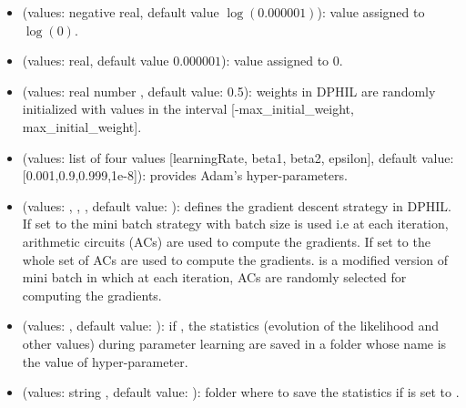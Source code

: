\documentclass[letterpaper,10pt,english]{sphinxmanual}
\begin{document}
\begin{itemize}
\begin{itemize}
\item {} 
 (values: negative real, default value \(\log(0.000001)\)): value assigned to \(\log(0)\).

\item {} 
 (values: real, default value \(0.000001\)): value assigned to \(0\).

\item {} 
 (values: real number , default value: 0.5): weights in DPHIL are randomly initialized with values in the interval {[}-max\_initial\_weight, max\_initial\_weight{]}.

\item {} 
 (values: list of four values {[}learningRate, beta1, beta2, epsilon{]}, default value: {[}0.001,0.9,0.999,1e-8{]}): provides Adam’s hyper-parameters.

\item {} 
 (values: , , , default value: ): defines the gradient descent strategy in DPHIL. If set to  the mini batch strategy with batch size  is used i.e at each iteration,  arithmetic circuits (ACs) are used to compute the gradients. If set to  the whole set of ACs are used to compute the gradients.  is a modified version of mini batch in which at each iteration,   ACs are randomly selected for computing the gradients.

\item {} 
 (values: , default value: ): if , the statistics (evolution of the likelihood and other values) during parameter learning are saved in a folder whose name is the value of  hyper-parameter.

\item {} 
 (values: string , default value: ): folder where to save the statistics if  is set to .


\end{itemize}
\end{itemize}
\end{document}
